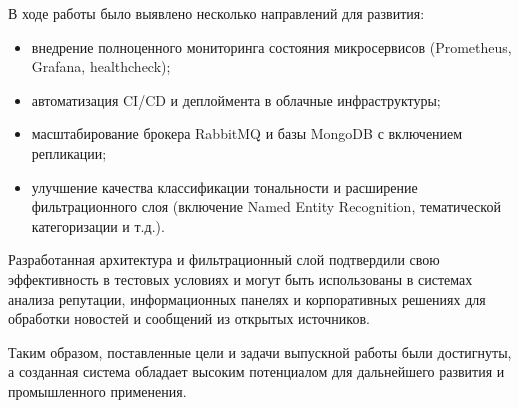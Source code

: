В ходе работы было выявлено несколько направлений для развития:

\begin{itemize}
\tightlist
\item
  внедрение полноценного мониторинга состояния микросервисов
  (Prometheus, Grafana, healthcheck);\\
\item
  автоматизация CI/CD и деплоймента в облачные инфраструктуры;\\
\item
  масштабирование брокера RabbitMQ и базы MongoDB с включением
  репликации;\\
\item
  улучшение качества классификации тональности и расширение
  фильтрационного слоя (включение Named Entity Recognition, тематической
  категоризации и т.д.).
\end{itemize}

Разработанная архитектура и фильтрационный слой подтвердили свою
эффективность в тестовых условиях и могут быть использованы в системах
анализа репутации, информационных панелях и корпоративных решениях для
обработки новостей и сообщений из открытых источников.

Таким образом, поставленные цели и задачи выпускной работы были
достигнуты, а созданная система обладает высоким потенциалом для
дальнейшего развития и промышленного применения.
